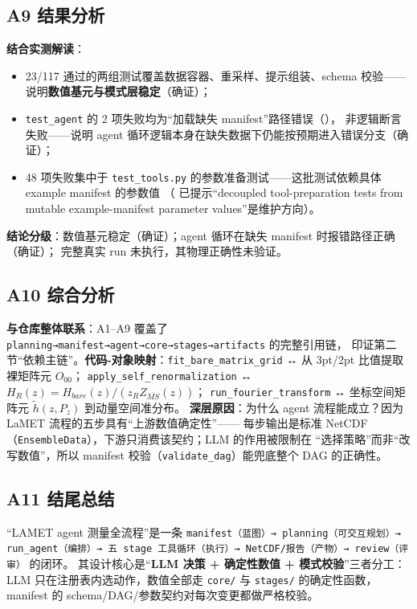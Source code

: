 \documentclass[UTF8]{ctexart}
\begin{document}
\subsection{A9 结果分析}

\textbf{结合实测解读}：
\begin{itemize}
\item 23/117 通过的两组测试覆盖数据容器、重采样、提示组装、schema 校验——说明\textbf{数值基元与模式层稳定}（确证）；
\item \texttt{test\_agent} 的 2 项失败均为“加载缺失 manifest”路径错误（\texttt{}），
非逻辑断言失败——说明 agent 循环逻辑本身在缺失数据下仍能按预期进入错误分支（确证）；
\item 48 项失败集中于 \texttt{test\_tools.py} 的参数准备测试——这批测试依赖具体 example manifest 的参数值
（\texttt{} 已提示“decoupled tool-preparation tests from mutable example-manifest parameter values”是维护方向）。
\end{itemize}

\textbf{结论分级}：数值基元稳定（确证）；agent 循环在缺失 manifest 时报错路径正确（确证）；
完整真实 run 未执行，其物理正确性\textcolor{warn}{未验证}。

\subsection{A10 综合分析}

\textbf{与仓库整体联系}：A1--A9 覆盖了 \texttt{planning→manifest→agent→core→stages→artifacts} 的完整引用链，
印证第二节“依赖主链”。\textbf{代码-对象映射}：\texttt{fit\_bare\_matrix\_grid} ↔ 从 3pt/2pt 比值提取裸矩阵元 $O_{00}$；
\texttt{apply\_self\_renormalization} ↔ $H_R(z)=H_{bare}(z)/(z_R Z_{\overline{MS}}(z))$；
\texttt{run\_fourier\_transform} ↔ 坐标空间矩阵元 $\tilde h(z,P_z)$ 到动量空间准分布。
\textbf{深层原因}：为什么 agent 流程能成立？因为 LaMET 流程的五步具有“上游数值确定性”——
每步输出是标准 NetCDF（\texttt{EnsembleData}），下游只消费该契约；LLM 的作用被限制在
“选择策略”而非“改写数值”，所以 manifest 校验（\texttt{validate\_dag}）能兜底整个 DAG 的正确性。

\subsection{A11 结尾总结}

\begin{conclbox}
“LAMET agent 测量全流程”是一条 \texttt{manifest（蓝图）→ planning（可交互规划）→ run\_agent（编排）→
五 stage 工具循环（执行）→ NetCDF/报告（产物）→ review（评审）} 的闭环。
其设计核心是“\textbf{LLM 决策 + 确定性数值 + 模式校验}”三者分工：
LLM 只在注册表内选动作，数值全部走 \texttt{core/} 与 \texttt{stages/} 的确定性函数，
manifest 的 schema/DAG/参数契约对每次变更都做严格校验。
\end{conclbox}
\end{document}

